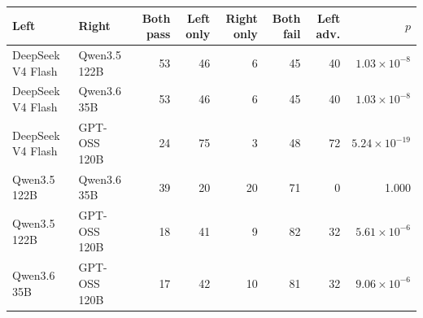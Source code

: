 \begin{tabular}{llrrrrrr}
\toprule
\textbf{Left} & \textbf{Right} & \textbf{Both pass} & \textbf{Left only} & \textbf{Right only} & \textbf{Both fail} & \textbf{Left adv.} & \textbf{$p$} \\
\midrule
DeepSeek V4 Flash & Qwen3.5 122B & 53 & 46 & 6 & 45 & 40 & $1.03\times 10^{-8}$ \\
DeepSeek V4 Flash & Qwen3.6 35B & 53 & 46 & 6 & 45 & 40 & $1.03\times 10^{-8}$ \\
DeepSeek V4 Flash & GPT-OSS 120B & 24 & 75 & 3 & 48 & 72 & $5.24\times 10^{-19}$ \\
Qwen3.5 122B & Qwen3.6 35B & 39 & 20 & 20 & 71 & 0 & 1.000 \\
Qwen3.5 122B & GPT-OSS 120B & 18 & 41 & 9 & 82 & 32 & $5.61\times 10^{-6}$ \\
Qwen3.6 35B & GPT-OSS 120B & 17 & 42 & 10 & 81 & 32 & $9.06\times 10^{-6}$ \\
\bottomrule
\end{tabular}
